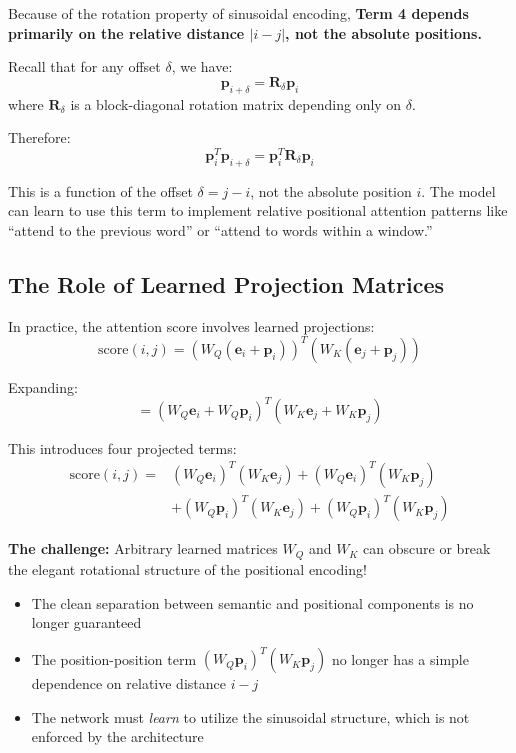 \documentclass{article}
\begin{document}
\begin{tcolorbox}[colback=green!5!white, colframe=green!50!black, title=The Key Insight: Position-Position Term and Relative Distance]
Because of the rotation property of sinusoidal encoding, \textbf{Term 4 depends primarily on the relative distance $|i-j|$, not the absolute positions.}

Recall that for any offset $\delta$, we have:
\[
\mathbf{p}_{i+\delta} = \mathbf{R}_\delta \mathbf{p}_i
\]
where $\mathbf{R}_\delta$ is a block-diagonal rotation matrix depending only on $\delta$.

Therefore:
\[
\mathbf{p}_i^T \mathbf{p}_{i+\delta} = \mathbf{p}_i^T \mathbf{R}_\delta \mathbf{p}_i
\]

This is a function of the offset $\delta = j - i$, not the absolute position $i$. The model can learn to use this term to implement relative positional attention patterns like ``attend to the previous word'' or ``attend to words within a window.''
\end{tcolorbox}

\subsection{The Role of Learned Projection Matrices}

In practice, the attention score involves learned projections:
\[
\text{score}(i, j) = (W_Q(\mathbf{e}_i + \mathbf{p}_i))^T (W_K(\mathbf{e}_j + \mathbf{p}_j))
\]

Expanding:
\[
= (W_Q \mathbf{e}_i + W_Q \mathbf{p}_i)^T (W_K \mathbf{e}_j + W_K \mathbf{p}_j)
\]

This introduces four projected terms:
\begin{align}
\text{score}(i, j) = &(W_Q \mathbf{e}_i)^T (W_K \mathbf{e}_j) + (W_Q \mathbf{e}_i)^T (W_K \mathbf{p}_j) \\
&+ (W_Q \mathbf{p}_i)^T (W_K \mathbf{e}_j) + (W_Q \mathbf{p}_i)^T (W_K \mathbf{p}_j)
\end{align}

\textbf{The challenge:} Arbitrary learned matrices $W_Q$ and $W_K$ can obscure or break the elegant rotational structure of the positional encoding!

\begin{itemize}
\item The clean separation between semantic and positional components is no longer guaranteed
\item The position-position term $(W_Q \mathbf{p}_i)^T (W_K \mathbf{p}_j)$ no longer has a simple dependence on relative distance $i-j$
\item The network must \textit{learn} to utilize the sinusoidal structure, which is not enforced by the architecture
\end{itemize}
\end{document}
